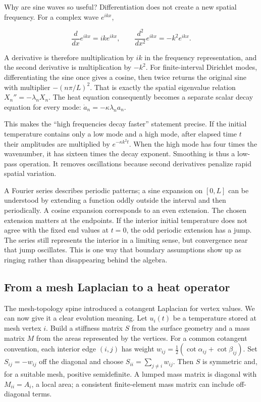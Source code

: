 Why are sine waves so useful? Differentiation does not create a new spatial frequency. For a complex wave \(e^{ikx}\),

\[
\frac{d}{dx}e^{ikx}=ik e^{ikx},
\qquad
\frac{d^2}{dx^2}e^{ikx}=-k^2 e^{ikx}.
\]

A derivative is therefore multiplication by \(ik\) in the frequency representation, and the second derivative is multiplication by \(-k^2\). For finite-interval Dirichlet modes, differentiating the sine once gives a cosine, then twice returns the original sine with multiplier \(-(n\pi/L)^2\). That is exactly the spatial eigenvalue relation \(X_n''=-\lambda_nX_n\). The heat equation consequently becomes a separate scalar decay equation for every mode: \(\dot a_n=-\kappa\lambda_na_n\).

This makes the ``high frequencies decay faster'' statement precise. If the initial temperature contains only a low mode and a high mode, after elapsed time \(t\) their amplitudes are multiplied by \(e^{-\kappa k^2t}\). When the high mode has four times the wavenumber, it has sixteen times the decay exponent. Smoothing is thus a low-pass operation. It removes oscillations because second derivatives penalize rapid spatial variation.

A Fourier series describes periodic patterns; a sine expansion on \([0,L]\) can be understood by extending a function oddly outside the interval and then periodically. A cosine expansion corresponds to an even extension. The chosen extension matters at the endpoints. If the interior initial temperature does not agree with the fixed end values at \(t=0\), the odd periodic extension has a jump. The series still represents the interior in a limiting sense, but convergence near that jump oscillates. This is one way that boundary assumptions show up as ringing rather than disappearing behind the algebra.

\subsection{From a mesh Laplacian to a heat operator}\label{04-visual-computing-ii-ch030-from-a-mesh-laplacian-to-a-heat-operator}

The mesh-topology spine introduced a cotangent Laplacian for vertex values. We can now give it a clear evolution meaning. Let \(u_i(t)\) be a temperature stored at mesh vertex \(i\). Build a stiffness matrix \(S\) from the surface geometry and a mass matrix \(M\) from the areas represented by the vertices. For a common cotangent convention, each interior edge \((i,j)\) has weight \(w_{ij}=\tfrac12(\cot\alpha_{ij}+\cot\beta_{ij})\). Set \(S_{ij}=-w_{ij}\) off the diagonal and choose \(S_{ii}=\sum_{j\ne i}w_{ij}\). Then \(S\) is symmetric and, for a suitable mesh, positive semidefinite. A lumped mass matrix is diagonal with \(M_{ii}=A_i\), a local area; a consistent finite-element mass matrix can include off-diagonal terms.

